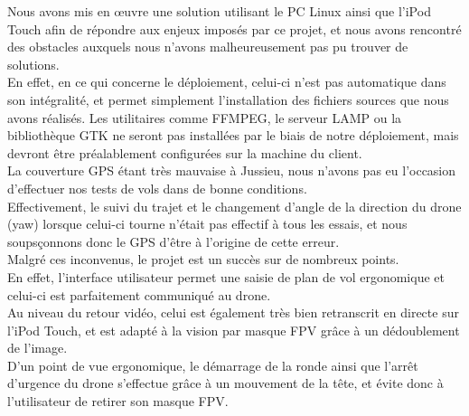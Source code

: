 \documentclass{article}
\begin{document}
Nous avons mis en œuvre une solution utilisant le PC Linux ainsi que l'iPod Touch afin de répondre aux enjeux imposés par ce projet, et nous avons rencontré des obstacles auxquels nous n'avons malheureusement pas pu trouver de solutions.\\
En effet, en ce qui concerne le déploiement, celui-ci n'est pas automatique dans son intégralité, et permet simplement l'installation des fichiers sources que nous avons réalisés. Les utilitaires comme FFMPEG, le serveur LAMP ou la bibliothèque GTK ne seront pas installées par le biais de notre déploiement, mais devront être préalablement configurées sur la machine du client.\\
La couverture GPS étant très mauvaise à Jussieu, nous n'avons pas eu l'occasion d'effectuer nos tests de vols dans de bonne conditions.\\
Effectivement, le suivi du trajet et le changement d'angle de la direction du drone (yaw) lorsque celui-ci tourne n'était pas effectif à tous les essais, et nous soupsçonnons donc le GPS d'être à l'origine de cette erreur.\\
Malgré ces inconvenus, le projet est un succès sur de nombreux points.\\
En effet, l'interface utilisateur permet une saisie de plan de vol ergonomique et celui-ci est parfaitement communiqué au drone.\\
Au niveau du retour vidéo, celui est également très bien retranscrit en directe sur l'iPod Touch, et est adapté à la vision par masque FPV grâce à un dédoublement de l'image.\\
D'un point de vue ergonomique, le démarrage de la ronde ainsi que l'arrêt d'urgence du drone s'effectue grâce à un mouvement de la tête, et évite donc à l'utilisateur de retirer son masque FPV.

	
 
\end{document}

